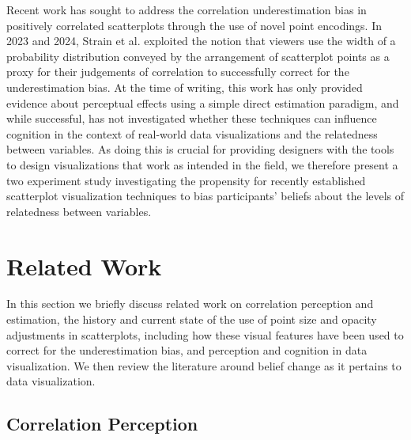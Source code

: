 \documentclass[manuscript,screen,review,anonymous]{acmart}
\begin{document}
Recent work has sought to address the correlation underestimation bias
in positively correlated scatterplots through the use of novel point
encodings. In 2023 and 2024, Strain et al.
\citep{strain_2023, strain_2023b, strain_2024} exploited the notion that
viewers use the width of a probability distribution conveyed by the
arrangement of scatterplot points as a proxy for their judgements of
correlation to successfully correct for the underestimation bias. At the
time of writing, this work has only provided evidence about perceptual
effects using a simple direct estimation paradigm, and while successful,
has not investigated whether these techniques can influence cognition in
the context of real-world data visualizations and the relatedness
between variables. As doing this is crucial for providing designers with
the tools to design visualizations that work as intended in the field,
we therefore present a two experiment study investigating the propensity
for recently established scatterplot visualization techniques to bias
participants' beliefs about the levels of relatedness between variables.

\section{Related Work}\label{sec-rel-work-main}

In this section we briefly discuss related work on correlation
perception and estimation, the history and current state of the use of
point size and opacity adjustments in scatterplots, including how these
visual features have been used to correct for the underestimation bias,
and perception and cognition in data visualization. We then review the
literature around belief change as it pertains to data visualization.

\subsection{Correlation Perception}\label{sec-corr-percept}
\end{document}
